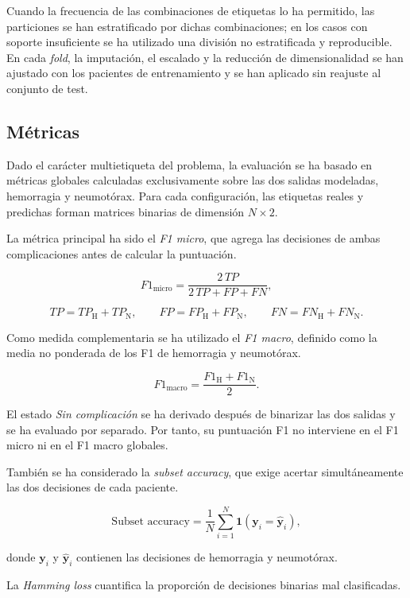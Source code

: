 Cuando la frecuencia de las combinaciones de etiquetas lo ha permitido, las particiones se han estratificado por dichas combinaciones; en los casos con soporte insuficiente se ha utilizado una división no estratificada y reproducible. En cada \textit{fold}, la imputación, el escalado y la reducción de dimensionalidad se han ajustado con los pacientes de entrenamiento y se han aplicado sin reajuste al conjunto de test.

\subsection{Métricas}\label{subsec:metricas_radiomica}



Dado el carácter multietiqueta del problema, la evaluación se ha basado en métricas globales calculadas exclusivamente sobre las dos salidas modeladas, hemorragia y neumotórax. Para cada configuración, las etiquetas reales y predichas forman matrices binarias de dimensión \(N \times 2\).

La métrica principal ha sido el \textit{F1 micro}, que agrega las decisiones de ambas complicaciones antes de calcular la puntuación.

\[
F1_{\text{micro}} = \frac{2 \, TP}{2 \, TP + FP + FN},
\]

\[
TP=TP_{\mathrm{H}}+TP_{\mathrm{N}}, \qquad
FP=FP_{\mathrm{H}}+FP_{\mathrm{N}}, \qquad
FN=FN_{\mathrm{H}}+FN_{\mathrm{N}}.
\]

Como medida complementaria se ha utilizado el \textit{F1 macro}, definido como la media no ponderada de los F1 de hemorragia y neumotórax.

\[
F1_{\text{macro}} = \frac{F1_{\mathrm{H}}+F1_{\mathrm{N}}}{2}.
\]

El estado \textit{Sin complicación} se ha derivado después de binarizar las dos salidas y se ha evaluado por separado. Por tanto, su puntuación F1 no interviene en el F1 micro ni en el F1 macro globales.

También se ha considerado la \textit{subset accuracy}, que exige acertar simultáneamente las dos decisiones de cada paciente.

\[
\text{Subset accuracy} = \frac{1}{N}\sum_{i=1}^{N}\mathbf{1}(\mathbf{y}_i = \hat{\mathbf{y}}_i),
\]

donde \(\mathbf{y}_i\) y \(\hat{\mathbf{y}}_i\) contienen las decisiones de hemorragia y neumotórax.

La \textit{Hamming loss} cuantifica la proporción de decisiones binarias mal clasificadas.

